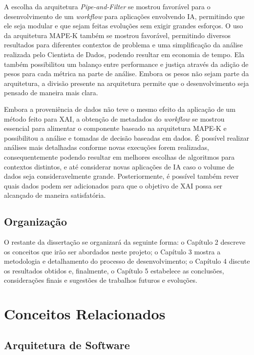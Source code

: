 \documentclass[portugues]{ic-tese}
\begin{document}
A escolha da arquitetura \textit{Pipe-and-Filter} se mostrou favorável para o desenvolvimento de um \textit{workflow} para aplicações envolvendo IA, permitindo que ele seja modular e que sejam feitas evoluções sem exigir grandes esforços. O uso da arquitetura MAPE-K também se mostrou favorável, permitindo diversos resultados para diferentes contextos de problema e uma simplificação da análise realizada pelo Cientista de Dados, podendo resultar em economia de tempo. Ela também possibilitou um balanço entre performance e justiça através da adição de pesos para cada métrica na parte de análise. Embora os pesos não sejam parte da arquitetura, a divisão presente na arquitetura permite que o desenvolvimento seja pensado de maneira mais clara.

Embora a proveniência de dados não teve o mesmo efeito da aplicação de um método feito para XAI, a obtenção de metadados do \textit{workflow} se mostrou essencial para alimentar o componente baseado na arquitetura MAPE-K e possibilitou a análise e tomadas de decisão baseadas em dados. É possível realizar análises mais detalhadas conforme novas execuções forem realizadas, consequentemente podendo resultar em melhores escolhas de algoritmos para contextos distintos, e até considerar novas aplicações de IA caso o volume de dados seja consideravelmente grande. Posteriormente, é possível também rever quais dados podem ser adicionados para que o objetivo de XAI possa ser alcançado de maneira satisfatória.

\section{Organização}

O restante da dissertação se organizará da seguinte forma: o Capítulo 2 descreve os conceitos que irão ser abordados neste projeto; o Capítulo 3 mostra a metodologia e detalhamento do processo de desenvolvimento; o Capítulo 4 discute os resultados obtidos e, finalmente, o Capítulo 5 estabelece as conclusões, considerações finais e sugestões de trabalhos futuros e evoluções.

\chapter{Conceitos Relacionados}

\section{Arquitetura de Software}
\end{document}
